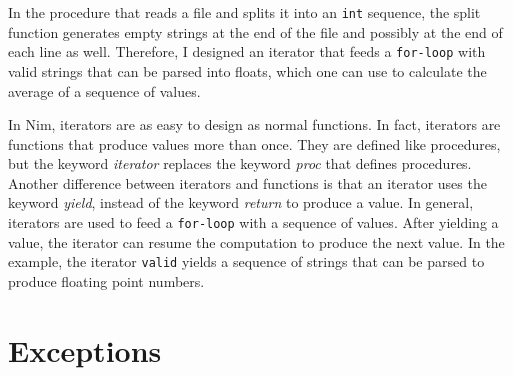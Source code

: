 \documentclass[
  12pt,
]{book}
\begin{document}
In the procedure that reads a file and splits it into an \texttt{int}
sequence, the split function generates empty strings at the end of the
file and possibly at the end of each line as well. Therefore, I designed
an iterator that feeds a \texttt{for-loop} with valid strings that can
be parsed into floats, which one can use to calculate the average of a
sequence of values.

In Nim, iterators are as easy to design as normal functions. In fact,
iterators are functions that produce values more than once. They are
defined like procedures, but the keyword \emph{iterator} replaces the
keyword \emph{proc} that defines procedures. Another difference between
iterators and functions is that an iterator uses the keyword
\emph{yield}, instead of the keyword \emph{return} to produce a value.
In general, iterators are used to feed a \texttt{for-loop} with a
sequence of values. After yielding a value, the iterator can resume the
computation to produce the next value. In the example, the iterator
\texttt{valid} yields a sequence of strings that can be parsed to
produce floating point numbers.

\chapter{Exceptions}\label{exceptions}
\end{document}
